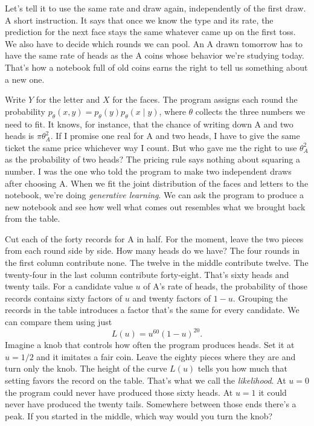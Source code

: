 Let's tell it to use the same rate and draw again, independently of the first draw. A short instruction. It says that once we know the type and its rate, the prediction for the next face stays the same whatever came up on the first toss. We also have to decide which rounds we can pool. An A drawn tomorrow has to have the same rate of heads as the A coins whose behavior we're studying today. That's how a notebook full of old coins earns the right to tell us something about a new one.

Write $Y$ for the letter and $X$ for the faces. The program assigns each round the probability $p_\theta(x,y)=p_\theta(y)p_\theta(x\mid y)$, where $\theta$ collects the three numbers we need to fit. It knows, for instance, that the chance of writing down A and two heads is $\pi\theta_A^2$. If I promise one real for A and two heads, I have to give the same ticket the same price whichever way I count. But who gave me the right to use $\theta_A^2$ as the probability of two heads? The pricing rule says nothing about squaring a number. I was the one who told the program to make two independent draws after choosing A. When we fit the joint distribution of the faces and letters to the notebook, we're doing \emph{generative learning}. We can ask the program to produce a new notebook and see how well what comes out resembles what we brought back from the table.

Cut each of the forty records for A in half. For the moment, leave the two pieces from each round side by side. How many heads do we have? The four rounds in the first column contribute none. The twelve in the middle contribute twelve. The twenty-four in the last column contribute forty-eight. That's sixty heads and twenty tails. For a candidate value $u$ of A's rate of heads, the probability of those records contains sixty factors of $u$ and twenty factors of $1-u$. Grouping the records in the table introduces a factor that's the same for every candidate. We can compare them using just
\[
                         L(u)=u^{60}(1-u)^{20}.
\]
Imagine a knob that controls how often the program produces heads. Set it at $u=1/2$ and it imitates a fair coin. Leave the eighty pieces where they are and turn only the knob. The height of the curve $L(u)$ tells you how much that setting favors the record on the table. That's what we call the \emph{likelihood}. At $u=0$ the program could never have produced those sixty heads. At $u=1$ it could never have produced the twenty tails. Somewhere between those ends there's a peak. If you started in the middle, which way would you turn the knob?

